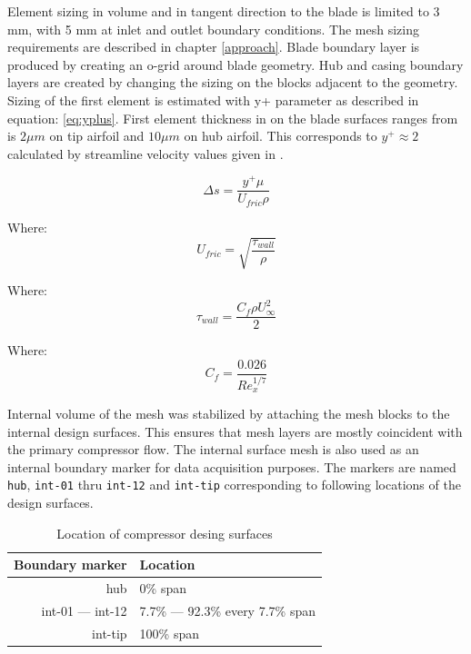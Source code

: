 Element sizing in volume and in tangent direction to the blade is limited to 3 mm, with 5 mm at inlet and outlet boundary conditions. The mesh sizing requirements are described in chapter \ref{approach}.  Blade boundary layer is produced by creating an o-grid around blade geometry. Hub and casing boundary layers are created by changing the sizing on the blocks adjacent to the geometry. Sizing of the first element is estimated with y+ parameter as described in equation: \ref{eq:yplus}. First element thickness in on the blade surfaces ranges from is $2 \mu m$ on tip airfoil and $10 \mu m$ on hub airfoil. This corresponds to $y^{+} \approx 2$ calculated by streamline velocity values given in \citep{r67laser}.

\begin{equation} \label{eq:yplus}
\Delta s = \frac{y^{+} \mu}{U_{fric} \rho}
\end{equation}

Where:
\begin{equation}
U_{fric} = \sqrt{\frac{\tau_{wall}}{\rho}}
\end{equation}

Where:
\begin{equation}
\tau_{wall} = \frac{C_f \rho U_{\infty}^{2}}{2}
\end{equation}

Where:
\begin{equation}
C_f = \frac{0.026}{Re_{x}^{1/7}}
\end{equation}

Internal volume of the mesh was stabilized by attaching the mesh blocks to the internal design surfaces. This ensures that mesh layers are mostly coincident with the primary compressor flow. The internal surface mesh is also used as an internal boundary marker for data acquisition purposes. The markers are named \texttt{hub}, \texttt{int-01} thru \texttt{int-12} and \texttt{int-tip} corresponding to following locations of the design surfaces.

\begin{table}[htb!]
\centering
\caption{Location of compressor desing surfaces} \label{tab:surfs}
\ttfamily
\begin{tabular}{@{}rl@{}}
\toprule
Boundary marker & Location \\ \midrule
hub & 0\% span  \\
int-01 --- int-12 & 7.7\% --- 92.3\% every 7.7\% span \\
int-tip & 100\% span \\
\bottomrule
\end{tabular}
\end{table}

